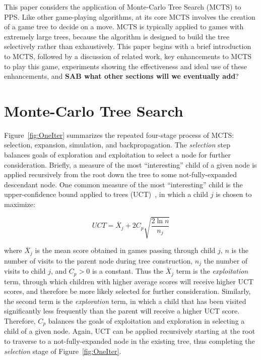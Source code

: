 \documentclass[letterpaper]{article}
\begin{document}
This paper considers the application of Monte-Carlo Tree Search (MCTS) to PPS. Like other game-playing algorithms, at its core MCTS involves the creation of a game tree to decide on a move. MCTS is typically applied to games with extremely large trees, because the algorithm is designed to build the tree selectively rather than exhaustively. This paper begins with a brief introduction to MCTS, followed by a discussion of related work, key enhancements to MCTS to play this game, experiments showing the effectiveness and ideal use of these enhancements, and {\bf SAB what other sections will we eventually add}?

\section{Monte-Carlo Tree Search}

Figure~\ref{fig:OneIter} summarizes the repeated four-stage process of MCTS: selection, expansion, simulation, and backpropagation. The {\it selection} step balances goals of exploration and exploitation to select a node for further consideration. Briefly, a measure of the most ``interesting'' child of a given node is applied recursively from the root down the tree to some not-fully-expanded descendant node. One common measure of the most ``interesting'' child is the upper-confidence bound applied to trees (UCT)~\cite{kocsis2006improved}, in which a child $j$ is chosen to maximize:

\begin{equation} \label{eq:UCT}
UCT = \overline{X}_j + 2C_p\sqrt{\frac{2\ln{n}}{n_j}}
\end{equation}

\noindent where $\overline{X}_j$ is the mean score obtained in games passing through child $j$, $n$ is the number of visits to the parent node during tree construction, $n_j$ the number of visits to child $j$, and $C_p > 0$ is a constant. Thus the $\overline{X}_j$ term is the {\it exploitation} term, through which children with higher average scores will receive higher UCT scores, and therefore be more likely selected for further consideration. Similarly, the second term is the {\it exploration} term, in which a child that has been visited significantly less frequently than the parent will receive a higher UCT score. Therefore, $C_p$ balances the goals of exploitation and exploration in selecting a child of a given node. Again, UCT can be applied recursively starting at the root to traverse to a not-fully-expanded node in the existing tree, thus completing the {\it selection} stage of Figure~\ref{fig:OneIter}.
\end{document}
